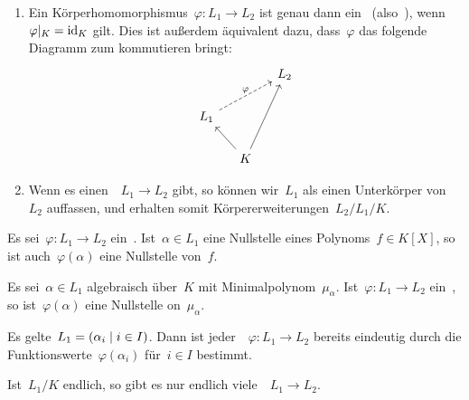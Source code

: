 \begin{remark}
  \leavevmode
  \begin{enumerate}
    \item
      Ein Körperhomomorphismus~$\varphi \colon L_1 \to L_2$ ist genau dann ein~ (also~), wenn~$\restrict{\varphi}{K} = \id_K$ gilt.
      Dies ist außerdem äquivalent dazu, dass~$\varphi$ das folgende Diagramm zum kommutieren bringt:
      \[
        \begin{tikzcd}[column sep = small]
          {}
          &
          {}
          &
          L_2
          \\
          L_1
          \arrow[dashed]{urr}[above]{\varphi}
          &
          {}
          &
          {}
          \\
          {}
          &
          K
          \arrow{ul}
          \arrow{uur}
          &
          {}
        \end{tikzcd}
      \]
    \item
      Wenn es einen~~$L_1 \to L_2$ gibt, so können wir~$L_1$ als einen Unterkörper von~$L_2$ auffassen, und erhalten somit Körpererweiterungen~$L_2/L_1/K$.
  \end{enumerate}
\end{remark}

\begin{proposition}
  Es sei~$\varphi \colon L_1 \to L_2$ ein~.
  Ist~$\alpha \in L_1$ eine Nullstelle eines Polynoms~$f \in K[X]$, so ist auch~$\varphi(\alpha)$ eine Nullstelle von~$f$.
\end{proposition}

\begin{corollary}
  \label{galois on elements}
  Es sei~$\alpha \in L_1$ algebraisch über~$K$ mit Minimalpolynom~$\mu_\alpha$.
  Ist~$\varphi \colon L_1 \to L_2$ ein~, so ist~$\varphi(\alpha)$ eine Nullstelle on~$\mu_\alpha$.
\end{corollary}

\begin{proposition}
  \label{galois uniqueness}
  Es gelte~$L_1 = (\alpha_i \suchthat i \in I)$.
  Dann ist jeder~~$\varphi \colon L_1 \to L_2$ bereits eindeutig durch die Funktionswerte~$\varphi(\alpha_i)$ für~$i \in I$ bestimmt.
\end{proposition}

\begin{corollary}
  Ist~$L_1/K$ endlich, so gibt es nur endlich viele~~$L_1 \to L_2$.
\end{corollary}



